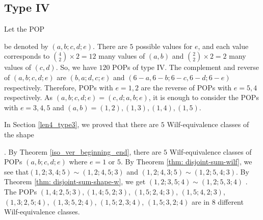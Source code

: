 \documentclass[12pt, english, a4paper]{article}
\theoremstyle{plain}
\theoremstyle{definition}
\theoremstyle{remark}
\begin{document}
\subsection{Type IV}
Let the POP  be denoted by $(a,b;c,d;e)$. There are $5$ possible values for $e$, and each value corresponds to $\binom{4}{2}\times2=12$ many values of $(a,b)$ and $\binom{2}{2}\times2=2$ many values of $(c,d)$. So, we have $120$ POPs of type IV. The complement and reverse of $(a,b;c,d;e)$ are $(b,a;d,c;e)$ and $(6-a,6-b;6-c,6-d;6-e)$ respectively. Therefore, POPs with $e=1,2$ are the reverse of POPs with $e=5,4$ respectively. As $(a,b;c,d;e)=(c,d;a,b;e)$, it is enough to consider the POPs with $e=3,4,5$ and $(a,b)=(1,2),(1,3),(1,4),(1,5)$. 

In Section \ref{len4_type3}, we proved that there are $5$ Wilf-equivalence classes of the shape . By Theorem \ref{iso_ver_beginning_end}, there are $5$ Wilf-equivalence classes of   POPs $(a,b;c,d;e)$ where $e=1$ or $5$. By Theorem \ref{thm: disjoint-sum-wilf}, we see that$(1,2;3,4;5)\sim (1,2;4,5;3)$ and $(1,2;4,3;5)\sim (1,2;5,4;3)$. By Theorem \ref{thm: disjoint-sum-shape-w}, we get  $(1,2;3,5;4)\sim (1,2;5,3;4)$ . 
 The POPs $(1,4;2,5;3), (1,4;5,2;3)$, $(1,5;2,4;3)$, $(1,5;4,2;3)$, $(1,3;2,5;4)$, $(1,3;5,2;4)$, $(1,5;2,3;4)$, $(1,5;3,2;4)$ are in $8$ different Wilf-equivalence classes. 
\end{document}

